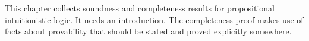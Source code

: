 \documentclass[../../../include/open-logic-chapter]{subfiles}
\begin{document}

\begin{editorial}
  This chapter collects soundness and completeness results for
  propositional intuitionistic logic. It needs an introduction. The
  completeness proof makes use of facts about provability that should
  be stated and proved explicitly somewhere.
\end{editorial}








\OLEndChapterHook
\end{document}
